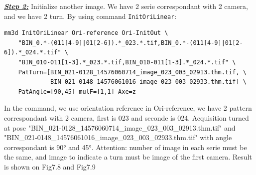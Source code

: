 \underline{\textit{\textbf{Step 2:}}} Initialize another image. We have 2 serie correspondant with 2 camera, and we have 2 turn. By using command {\tt InitOriLinear}:
\begin{verbatim}
mm3d InitOriLinear Ori-reference Ori-InitOut \
    "BIN_0.*-(011[4-9]|01[2-6]).*_023.*.tif,BIN_0.*-(011[4-9]|01[2-6]).*_024.*.tif" \
    "BIN_010-011[1-3].*_023.*.tif,BIN_010-011[1-3].*_024.*.tif" \
    PatTurn=[BIN_021-0128_14576060714_image_023_003_02913.thm.tif, \
             BIN_021-0148_14576061016_image_023_003_02933.thm.tif] \
    PatAngle=[90,45] mulF=[1,1] Axe=z
\end{verbatim}

In the command, we use orientation reference in Ori-reference, we have 2 pattern correspondant with 2 camera, first is 023 and seconde is 024. Acquisition turned at pose "BIN\_021-0128\_14576060714\_image\_023\_003\_02913.thm.tif" and "BIN\_021-0148\_14576061016\_image\_023\_003\_02933.thm.tif" with angle correspondant is 90° and 45°. Attention: number of image in each serie must be the same, and image to indicate a turn must be image of the first camera.
Result is shown on Fig7.8 and Fig7.9

